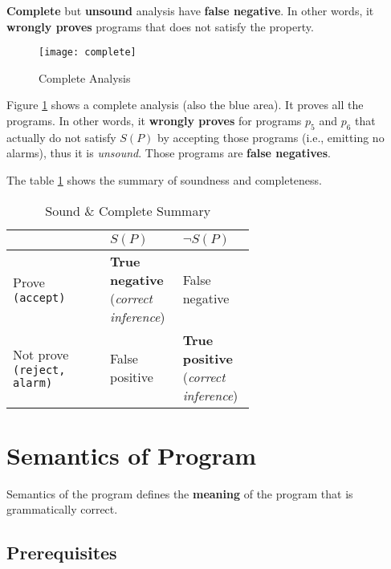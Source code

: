 \textbf{Complete} but \textbf{unsound} analysis have \textbf{false
  negative}. In other words, it \textbf{wrongly proves} programs that
does not satisfy the property.


\begin{figure}[h]
  \texttt{[image: complete]}
  \caption{Complete Analysis}
  \label{fig:complete}
\end{figure}

Figure \ref{fig:complete} shows a complete analysis (also the blue
area). It proves all the programs. In other words, it \textbf{wrongly
  proves} for programs $ p_5 $ and $ p_6 $ that actually do not
satisfy $ S(P) $ by accepting those programs (i.e., emitting no
alarms), thus it is \textit{unsound}. Those programs are \textbf{false
  negatives}.


The table \ref{tab:summary} shows the summary of soundness and
completeness.

\begin{table}[ht]
  \centering
  \caption{Sound \& Complete Summary}
  \label{tab:summary}

  \begin{tabular}[t]{l>{\raggedright}p{0.3\linewidth}>{\raggedright\arraybackslash}p{0.3\linewidth}}
    \hline
    & $ S(P) $ & $ \neg S(P) $ \\
    \hline
    Prove \texttt{(accept)} & \textbf{True negative} (\textsl{correct inference}) & False negative \\
    Not prove \texttt{(reject, alarm)} & False positive & \textbf{True positive} (\textsl{correct inference}) \\
    \hline
  \end{tabular}
\end{table}%



\section{Semantics of Program}
\label{sec:semantics}

Semantics of the program defines the \textbf{meaning} of the program
that is grammatically correct.

\subsection{Prerequisites}


